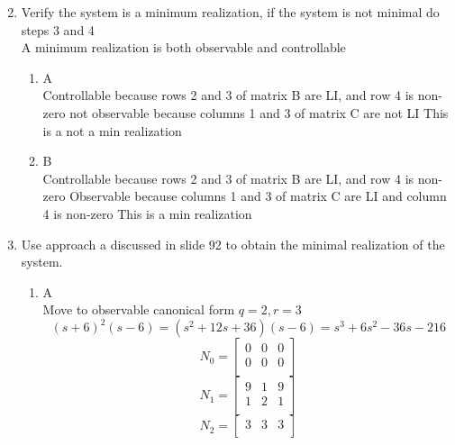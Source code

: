 \begin{enumerate}
\begin{enumerate}
\begin{equation}
      \end{equation}
    \end{enumerate}
  \item Verify the system is a minimum realization, if the system is not minimal do steps 3 and 4 \\
    A minimum realization is both observable and controllable
    \begin{enumerate}
    \item A\\
      Controllable because rows 2 and 3 of matrix B are LI, and row 4 is non-zero
      not observable because columns 1 and 3 of matrix C are not LI
      This is a not a min realization
    \item B\\
      Controllable because rows 2 and 3 of matrix B are LI, and row 4 is non-zero
      Observable because columns 1 and 3 of matrix C are LI and column 4 is non-zero
      This is a min realization
    \end{enumerate}
  \item Use approach a discussed in slide 92 to obtain the minimal realization of the system. \\
    \begin{enumerate}
    \item A\\
      Move to observable canonical form
      $q = 2, r =3$
      \begin{equation}
        (s+6)^2(s-6) = (s^2 + 12s + 36)(s-6) = s^3 + 6s^2 - 36s - 216
      \end{equation}
      \begin{equation}
        N_0 =
        \begin{bmatrix}
          0 & 0 & 0 \\
          0 & 0 & 0 \\
        \end{bmatrix}
      \end{equation}
      \begin{equation}
        N_1 =
        \begin{bmatrix}
          9 & 1 & 9 \\
          1 & 2 & 1 \\
        \end{bmatrix}
      \end{equation}
      \begin{equation}
        N_2 =
        \begin{bmatrix}
          3 & 3 & 3 \\

\end{bmatrix}
\end{equation}
\end{enumerate}
\end{enumerate}
